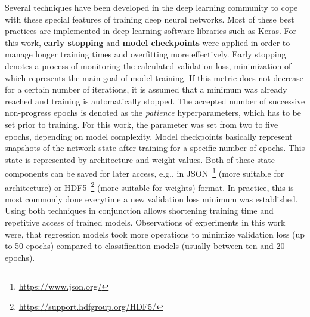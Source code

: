 Several techniques have been developed in the deep learning community to cope
with these special features of training deep neural networks.
Most of these best practices are implemented in deep learning software libraries
such as Keras.
For this work, \textbf{early stopping} and \textbf{model checkpoints} were applied
in order to manage longer training times and overfitting more effectively.
Early stopping denotes a process of monitoring the calculated validation loss,
minimization of which represents the main goal of model training.
If this metric does not decrease for a certain number of iterations, it is assumed
that a minimum was already reached and training is automatically stopped.
The accepted number of successive non-progress epochs is denoted as the
\textit{patience} hyperparameters, which has to be set prior to training.
For this work, the parameter was set from two to five epochs, depending on
model complexity.
Model checkpoints basically represent snapshots of the network state after training
for a specific number of epochs.
This state is represented by architecture and weight values.
Both of these state components can be saved for later access, e.g., in JSON~\footnote{\url{https://www.json.org/}} 
(more suitable for architecture) or HDF5~\footnote{\url{https://support.hdfgroup.org/HDF5/}}
(more suitable for weights) format.
In practice, this is most commonly done everytime a new validation loss minimum
was established.
Using both techniques in conjunction allows shortening training time and
repetitive access of trained models.
Observations of experiments in this work were, that regression models took
more operations to minimize validation loss (up to 50 epochs) compared
to classification models (usually between ten and 20 epochs).
